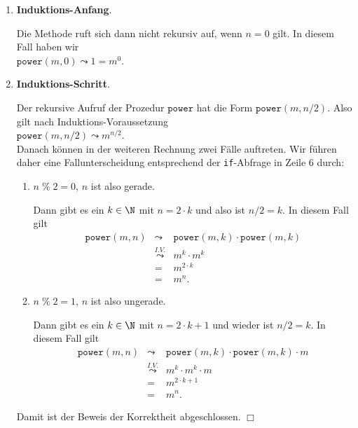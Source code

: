 \begin{enumerate}
\item \textbf{Induktions-Anfang}.

      Die Methode ruft sich dann nicht rekursiv auf, wenn $n = 0$  gilt.  In diesem Fall
      haben wir \\[0.1cm]
      \hspace*{1.3cm} 
      $\mathtt{power}(m,0) \leadsto 1 =  m^0$.
\item \textbf{Induktions-Schritt}.

      Der rekursive Aufruf der Prozedur $\mathtt{power}$ hat die Form 
       $\mathtt{power}(m,n/2)$.  Also gilt nach Induktions-Voraussetzung \\[0.1cm]
       \hspace*{1.3cm} $\displaystyle \mathtt{power}(m,n/2) \leadsto m^{n/2}$. \\[0.1cm]
       Danach k\"onnen in der weiteren Rechnung zwei F\"alle auftreten.
       Wir f\"uhren daher eine Fallunterscheidung entsprechend der \texttt{if}-Abfrage in Zeile 6 durch:
      \begin{enumerate}
      \item $n \;\mathtt{\%}\; 2 = 0$, $n$ ist also gerade.

            Dann gibt es ein $k \in \N$ mit $n = 2 \cdot k$ und also ist $n/2 = k$.
            In diesem Fall gilt 
            \[ 
            \begin{array}{lcl}
            \mathtt{power}(m,n) & \leadsto & \mathtt{power}(m,k) \cdot \mathtt{power}(m,k) \\[0.1cm]
                                & \stackrel{I.V.}{\leadsto} & m^k \cdot m^k  \\[0.1cm]
                                & = & m^{2\cdot k} \\[0.1cm]
                                & = & m^{n}.
            \end{array}
            \]            
      \item $n \;\mathtt{\%}\; 2 = 1$, $n$ ist also ungerade.

            Dann gibt es ein $k \in \N$ mit $n = 2 \cdot k + 1$ und wieder ist $n/2 = k$.
            In diesem Fall gilt 
            \[ 
            \begin{array}{lcl}
            \mathtt{power}(m,n) & \leadsto & \mathtt{power}(m,k) \cdot \mathtt{power}(m,k) \cdot m  \\[0.1cm]
                                & \stackrel{I.V.}{\leadsto} & m^k \cdot m^k \cdot m  \\[0.1cm]
                                & = & m^{2\cdot k+1} \\[0.1cm]
                                & = & m^{n}.
            \end{array}
            \]
      \end{enumerate}
      Damit ist der Beweis der Korrektheit abgeschlossen. \hspace*{\fill} $\Box$
\end{enumerate}
